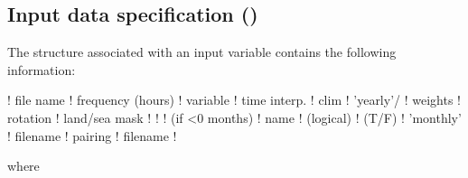 \documentclass[../main/NEMO_manual]{subfiles}
\begin{document}
\subsection[Input data specification (\textit{fldread.F90})]{Input data specification (\protect{})}
\label{subsec:SBC_fldread}

The structure associated with an input variable contains the following information:
\begin{forlines}
!  file name  ! frequency (hours) ! variable  ! time interp. !  clim  ! 'yearly'/ ! weights  ! rotation ! land/sea mask !
!             !  (if <0  months)  !   name    !   (logical)  !  (T/F) ! 'monthly' ! filename ! pairing  ! filename      !
\end{forlines}
where
\end{document}

